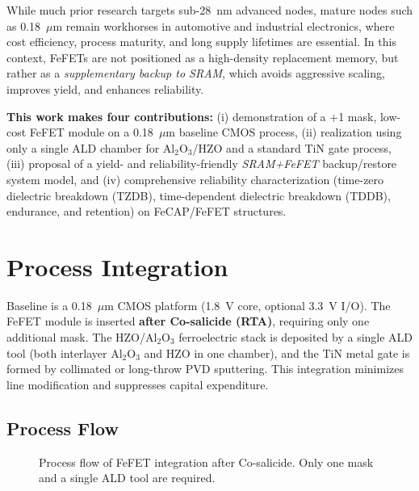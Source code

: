 \documentclass[conference]{IEEEtran}
\begin{document}
While much prior research targets sub-28~nm advanced nodes, mature nodes such as 0.18~$\mu$m remain workhorses in automotive and industrial electronics, 
where cost efficiency, process maturity, and long supply lifetimes are essential.  
In this context, FeFETs are not positioned as a high-density replacement memory, but rather as a \textit{supplementary backup to SRAM}, 
which avoids aggressive scaling, improves yield, and enhances reliability.

\textbf{This work makes four contributions:}  
(i) demonstration of a +1 mask, low-cost FeFET module on a 0.18~$\mu$m baseline CMOS process,  
(ii) realization using only a single ALD chamber for Al$_2$O$_3$/HZO and a standard TiN gate process,  
(iii) proposal of a yield- and reliability-friendly \textit{SRAM+FeFET} backup/restore system model, and  
(iv) comprehensive reliability characterization (time-zero dielectric breakdown (TZDB), time-dependent dielectric breakdown (TDDB), endurance, and retention) on FeCAP/FeFET structures.

\section{Process Integration}
Baseline is a 0.18~$\mu$m CMOS platform (1.8~V core, optional 3.3~V I/O).
The FeFET module is inserted \textbf{after Co-salicide (RTA)}, requiring only one additional mask.
The HZO/Al$_2$O$_3$ ferroelectric stack is deposited by a single ALD tool (both interlayer Al$_2$O$_3$ and HZO in one chamber), 
and the TiN metal gate is formed by collimated or long-throw PVD sputtering.
This integration minimizes line modification and suppresses capital expenditure.

\subsection{Process Flow}
\begin{figure}[!t]
  \centering
  \caption{Process flow of FeFET integration after Co-salicide. Only one mask and a single ALD tool are required.}
  \label{fig:flow}
\end{figure}
\end{document}

